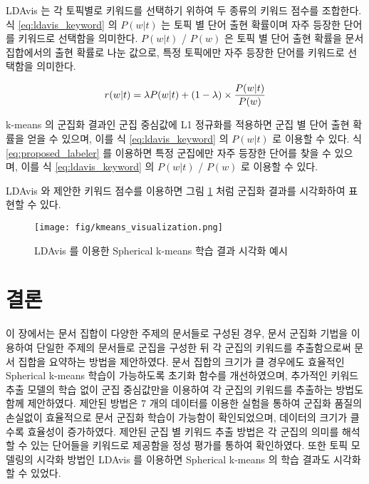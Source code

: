 \documentclass[oneside, ko,phd]{snuthesis_utf8_kor}
\begin{document}
LDAvis 는 각 토픽별로 키워드를 선택하기 위하여 두 종류의 키워드 점수를 조합한다.
식 \ref{eq:ldavis_keyword} 의 $P(w \vert t)$ 는 토픽 별 단어 출현 확률이며 자주 등장한 단어를 키워드로 선택함을 의미한다.
$P(w \vert t)$ / $P(w)$ 은 토픽 별 단어 출현 확률을 문서 집합에서의 출현 확률로 나눈 값으로, 특정 토픽에만 자주 등장한 단어를 키워드로 선택함을 의미한다.

\begin{equation}
\label{eq:ldavis_keyword}
\centering
r(w \vert t) = \lambda P(w \vert t) + (1 - \lambda) \times \frac{P(w \vert t)}{P(w)}
\end{equation}

k-means 의 군집화 결과인 군집 중심값에 L1 정규화를 적용하면 군집 별 단어 출현 확률을 얻을 수 있으며, 이를 식 \ref{eq:ldavis_keyword} 의 $P(w \vert t)$ 로 이용할 수 있다.
식 \ref{eq:proposed_labeler} 를 이용하면 특정 군집에만 자주 등장한 단어를 찾을 수 있으며, 이를 식 \ref{eq:ldavis_keyword} 의 $P(w \vert t)$ / $P(w)$ 로 이용할 수 있다.

LDAvis 와 제안한 키워드 점수를 이용하면 그림 \ref{fig:kmeans_ldavis} 처럼 군집화 결과를 시각화하여 표현할 수 있다.

\begin{figure}[H]
\centering
\texttt{[image: fig/kmeans\_visualization.png]}
\caption{LDAvis 를 이용한 Spherical k-means 학습 결과 시각화 예시}
\label{fig:kmeans_ldavis}
\end{figure}


\section{결론}

이 장에서는 문서 집합이 다양한 주제의 문서들로 구성된 경우, 문서 군집화 기법을 이용하여 단일한 주제의 문서들로 군집을 구성한 뒤 각 군집의 키워드를 추출함으로써 문서 집합을 요약하는 방법을 제안하였다.
문서 집합의 크기가 클 경우에도 효율적인 Spherical k-means 학습이 가능하도록 초기화 함수를 개선하였으며, 추가적인 키워드 추출 모델의 학습 없이 군집 중심값만을 이용하여 각 군집의 키워드를 추출하는 방법도 함께 제안하였다.
제안된 방법은 7 개의 데이터를 이용한 실험을 통하여 군집화 품질의 손실없이 효율적으로 문서 군집화 학습이 가능함이 확인되었으며, 데이터의 크기가 클수록 효율성이 증가하였다.
제안된 군집 별 키워드 추출 방법은 각 군집의 의미를 해석할 수 있는 단어들을 키워드로 제공함을 정성 평가를 통하여 확인하였다.
또한 토픽 모델링의 시각화 방법인 LDAvis 를 이용하면 Spherical k-means 의 학습 결과도 시각화 할 수 있었다.
\end{document}
